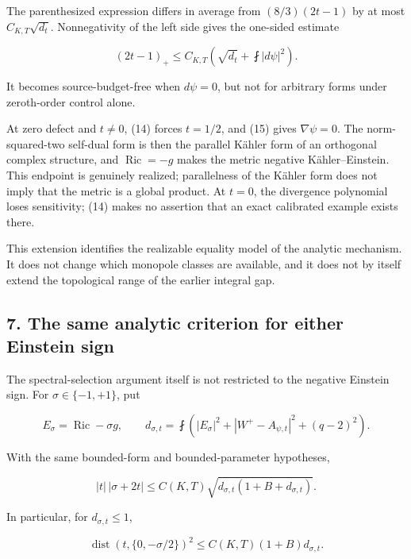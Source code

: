 \documentclass[
  10pt,
]{article}
\begin{document}
The parenthesized expression differs in average from \((8/3)(2t-1)\) by
at most \(C_{K,T}\sqrt{d_t}\). Nonnegativity of the left side gives the
one-sided estimate

\[
 (2t-1)_+\le C_{K,T}\left(\sqrt{d_t}+\fint|d\psi|^2\right).
                                                               \tag{20}
\]

It becomes source-budget-free when \(d\psi=0\), but not for arbitrary
forms under zeroth-order control alone.

At zero defect and \(t\ne0\), (14) forces \(t=1/2\), and (15) gives
\(\nabla\psi=0\). The norm-squared-two self-dual form is then the
parallel Kähler form of an orthogonal complex structure, and
\(\operatorname{Ric}=-g\) makes the metric negative Kähler--Einstein.
This endpoint is genuinely realized; parallelness of the Kähler form
does not imply that the metric is a global product. At \(t=0\), the
divergence polynomial loses sensitivity; (14) makes no assertion that an
exact calibrated example exists there.

This extension identifies the realizable equality model of the analytic
mechanism. It does not change which monopole classes are available, and
it does not by itself extend the topological range of the earlier
integral gap.

\hypertarget{the-same-analytic-criterion-for-either-einstein-sign}{%
\subsection{7. The same analytic criterion for either Einstein
sign}\label{the-same-analytic-criterion-for-either-einstein-sign}}

The spectral-selection argument itself is not restricted to the negative
Einstein sign. For \(\sigma\in\{-1,+1\}\), put

\[
E_\sigma=\operatorname{Ric}-\sigma g,\qquad
d_{\sigma,t}=\fint\left(
|E_\sigma|^2+|W^+-A_{\psi,t}|^2+(q-2)^2\right).
\]

With the same bounded-form and bounded-parameter hypotheses,

\[
\boxed{\quad
|t|\,|\sigma+2t|
\le C(K,T)\sqrt{d_{\sigma,t}(1+B+d_{\sigma,t})}.
\quad}                                                     \tag{21}
\]

In particular, for \(d_{\sigma,t}\le1\),

\[
\operatorname{dist}(t,\{0,-\sigma/2\})^2
\le C(K,T)(1+B)d_{\sigma,t}.                               \tag{22}
\]
\end{document}
